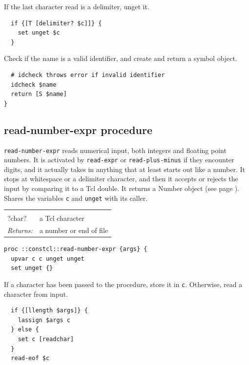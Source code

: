 \documentclass[a5paper,draft]{memoir}
\begin{document}
If the last character read is a delimiter, unget it.

\begin{lstlisting}
  if {[T [delimiter? $c]]} {
    set unget $c
  }
\end{lstlisting}

Check if the name is a valid identifier, and create and return a symbol object.

\begin{lstlisting}
  # idcheck throws error if invalid identifier
  idcheck $name
  return [S $name]
}
\end{lstlisting}

\subsection{read-number-expr procedure}
\label{readnumberexpr-procedure}

\texttt{read-number-expr} reads numerical input, both integers and floating point numbers. It is activated by \texttt{read-expr} or \texttt{read-plus-minus} if they encounter digits, and it actually takes in anything that at least starts out like a number. It stops at whitespace or a delimiter character, and then it accepts or rejects the input by comparing it to a Tcl double. It returns a Number object (see page \pageref{numbers}). Shares the variables \texttt{c} and \texttt{unget} with its caller.

\noindent\begin{tabular}{ |p{1.9cm} p{6.5cm}| }
\hline
\rowcolor[HTML]{CCCCCC} \multicolumn{2}{|l|}{\textbf{read-number-expr (internal)}} \\
?char? & a Tcl character \\
\textit{Returns:} & a number or end of file \\
\hline
\end{tabular}

\begin{lstlisting}
proc ::constcl::read-number-expr {args} {
  upvar c c unget unget
  set unget {}
\end{lstlisting}

If a character has been passed to the procedure, store it in \texttt{c}. Otherwise, read a character from input.

\begin{lstlisting}
  if {[llength $args]} {
    lassign $args c
  } else {
    set c [readchar]
  }
  read-eof $c
\end{lstlisting}
\end{document}
